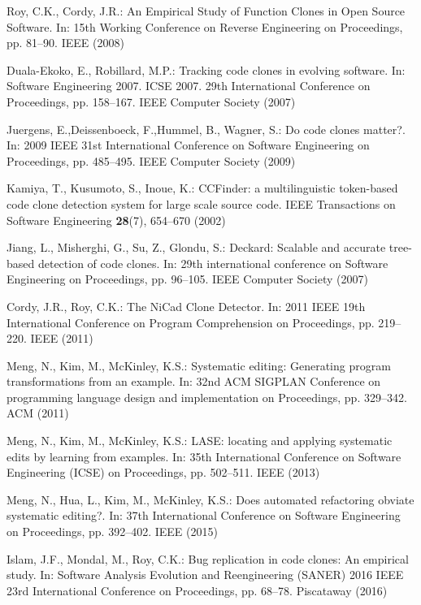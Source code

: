 \documentclass[runningheads]{llncs}
\begin{document}
\begin{thebibliography}{8}
Roy, C.K., Cordy, J.R.: An Empirical Study of Function Clones in Open Source Software. In: 15th Working Conference on Reverse Engineering
on Proceedings, pp. 81--90. IEEE (2008)

Duala-Ekoko, E., Robillard, M.P.: Tracking code clones in evolving software. In: Software Engineering 2007. ICSE 2007. 29th International Conference
on Proceedings, pp. 158--167.  IEEE Computer Society (2007)

Juergens, E.,Deissenboeck, F.,Hummel, B., Wagner, S.: Do code clones matter?. In: 2009 IEEE 31st International Conference on Software Engineering
on Proceedings, pp. 485--495. IEEE Computer Society (2009)

Kamiya, T., Kusumoto, S., Inoue, K.: CCFinder: a multilinguistic token-based code clone detection system for large scale source code. IEEE Transactions on Software Engineering \textbf{28}(7), 654--670 (2002)

Jiang, L., Misherghi, G., Su, Z., Glondu, S.: Deckard: Scalable and accurate tree-based detection of code clones. In: 29th international conference on Software Engineering
on Proceedings, pp. 96--105. IEEE Computer Society (2007)

Cordy, J.R., Roy, C.K.: The NiCad Clone Detector. In: 2011 IEEE 19th International Conference on Program Comprehension
on Proceedings, pp. 219--220. IEEE (2011)

Meng, N., Kim, M., McKinley, K.S.: Systematic editing: Generating program transformations from an example. In: 32nd ACM SIGPLAN Conference on programming language design and implementation
on Proceedings, pp. 329--342. ACM (2011)

Meng, N., Kim, M., McKinley, K.S.: LASE: locating and applying systematic edits by learning from examples. In: 35th International Conference on Software Engineering (ICSE)
on Proceedings, pp. 502--511. IEEE (2013)

Meng, N., Hua, L., Kim, M., McKinley, K.S.: Does automated refactoring obviate systematic editing?. In: 37th International Conference on Software Engineering
on Proceedings, pp. 392--402. IEEE (2015)

Islam, J.F., Mondal, M., Roy, C.K.: Bug replication in code clones: An empirical study. In: Software Analysis Evolution and Reengineering (SANER) 2016 IEEE 23rd International Conference
on Proceedings, pp. 68--78. Piscataway (2016)


\end{thebibliography}
\end{document}
